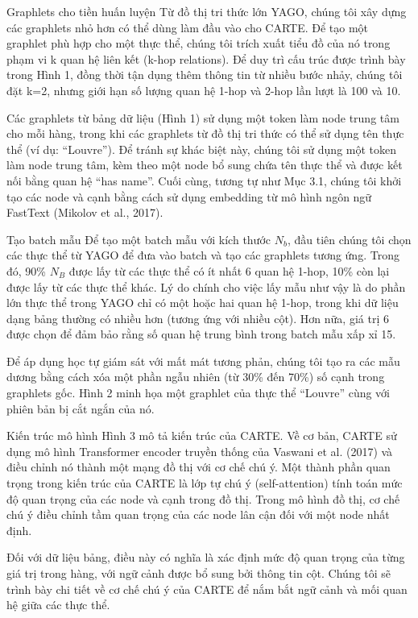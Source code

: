 \documentclass{article}
\begin{document}
Graphlets cho tiền huấn luyện
Từ đồ thị tri thức lớn YAGO, chúng tôi xây dựng các graphlets nhỏ hơn có thể dùng làm đầu vào cho CARTE. Để tạo một graphlet phù hợp cho một thực thể, chúng tôi trích xuất tiểu đồ của nó trong phạm vi k quan hệ liên kết (k-hop relations). Để duy trì cấu trúc được trình bày trong Hình 1, đồng thời tận dụng thêm thông tin từ nhiều bước nhảy, chúng tôi đặt k=2, nhưng giới hạn số lượng quan hệ 1-hop và 2-hop lần lượt là 100 và 10.

Các graphlets từ bảng dữ liệu (Hình 1) sử dụng một token làm node trung tâm cho mỗi hàng, trong khi các graphlets từ đồ thị tri thức có thể sử dụng tên thực thể (ví dụ: “Louvre”). Để tránh sự khác biệt này, chúng tôi sử dụng một token làm node trung tâm, kèm theo một node bổ sung chứa tên thực thể và được kết nối bằng quan hệ “has name”. Cuối cùng, tương tự như Mục 3.1, chúng tôi khởi tạo các node và cạnh bằng cách sử dụng embedding từ mô hình ngôn ngữ FastText (Mikolov et al., 2017).

Tạo batch mẫu
Để tạo một batch mẫu với kích thước $N_b$, đầu tiên chúng tôi chọn các thực thể từ YAGO để đưa vào batch và tạo các graphlets tương ứng. Trong đó, 90\% $N_B$ được lấy từ các thực thể có ít nhất 6 quan hệ 1-hop, 10\% còn lại được lấy từ các thực thể khác. Lý do chính cho việc lấy mẫu như vậy là do phần lớn thực thể trong YAGO chỉ có một hoặc hai quan hệ 1-hop, trong khi dữ liệu dạng bảng thường có nhiều hơn (tương ứng với nhiều cột). Hơn nữa, giá trị 6 được chọn để đảm bảo rằng số quan hệ trung bình trong batch mẫu xấp xỉ 15.

Để áp dụng học tự giám sát với mất mát tương phản, chúng tôi tạo ra các mẫu dương bằng cách xóa một phần ngẫu nhiên (từ 30\% đến 70\%) số cạnh trong graphlets gốc. Hình 2 minh họa một graphlet của thực thể “Louvre” cùng với phiên bản bị cắt ngắn của nó.

Kiến trúc mô hình
Hình 3 mô tả kiến trúc của CARTE. Về cơ bản, CARTE sử dụng mô hình Transformer encoder truyền thống của Vaswani et al. (2017) và điều chỉnh nó thành một mạng đồ thị với cơ chế chú ý. Một thành phần quan trọng trong kiến trúc của CARTE là lớp tự chú ý (self-attention) tính toán mức độ quan trọng của các node và cạnh trong đồ thị. Trong mô hình đồ thị, cơ chế chú ý điều chỉnh tầm quan trọng của các node lân cận đối với một node nhất định.

Đối với dữ liệu bảng, điều này có nghĩa là xác định mức độ quan trọng của từng giá trị trong hàng, với ngữ cảnh được bổ sung bởi thông tin cột. Chúng tôi sẽ trình bày chi tiết về cơ chế chú ý của CARTE để nắm bắt ngữ cảnh và mối quan hệ giữa các thực thể.
\end{document}
